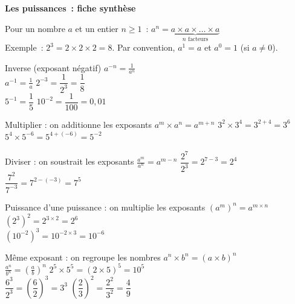 \documentclass[14pt]{extarticle}
\begin{document}
{\centering\LARGE\bfseries Les puissances~: fiche synthèse\par}
\vspace{4pt}

\begin{tcolorbox}[colback=GrayBG!50, colframe=BlueDef, fonttitle=\bfseries, title=Définition]
  Pour un nombre $a$ et un entier $n \geqslant 1$~: \hfill $a^n = \underbrace{a \times a \times \dots \times a}_{n \text{ facteurs}}$ \hfill\null \\[2pt]
  Exemple~: $2^3 = 2 \times 2 \times 2 = 8$. \hfill Par convention, $a^1 = a$ et $a^0 = 1$ (si $a \neq 0$).
\end{tcolorbox}

\begin{regle}{Inverse (exposant négatif)}
  $\displaystyle a^{-n} = \frac{1}{a^n}$ \\[5pt]
  $\displaystyle a^{-1} = \frac{1}{a}$
  \tcblower
  $2^{-3} = \dfrac{1}{2^3} = \dfrac{1}{8}$ \\[5pt]
  $5^{-1} = \dfrac{1}{5}$ \qquad $10^{-2} = \dfrac{1}{100} = 0{,}01$
\end{regle}

\begin{regle}{Multiplier : on additionne les exposants}
  $\displaystyle a^m \times a^n = a^{m+n}$
  \tcblower
  $3^2 \times 3^4 = 3^{2+4} = 3^6$ \\[5pt]
  $5^4 \times 5^{-6} = 5^{4+(-6)} = 5^{-2}$
\end{regle}

\begin{regle}{Diviser : on soustrait les exposants}
  $\displaystyle \frac{a^m}{a^n} = a^{m-n}$
  \tcblower
  $\dfrac{2^7}{2^3} = 2^{7-3} = 2^4$ \\[5pt]
  $\dfrac{7^2}{7^{-3}} = 7^{2-(-3)} = 7^5$
\end{regle}

\begin{regle}{Puissance d'une puissance : on multiplie les exposants}
  $\displaystyle \left(a^m\right)^n = a^{m \times n}$
  \tcblower
  $\left(2^3\right)^2 = 2^{3 \times 2} = 2^6$ \\[5pt]
  $\left(10^{-2}\right)^3 = 10^{-2 \times 3} = 10^{-6}$
\end{regle}

\begin{regle}{Même exposant : on regroupe les nombres}
  $\displaystyle a^n \times b^n = (a \times b)^n$ \\[5pt]
  $\displaystyle \frac{a^n}{b^n} = \left(\frac{a}{b}\right)^n$
  \tcblower
  $2^5 \times 5^5 = (2 \times 5)^5 = 10^5$ \\[5pt]
  $\dfrac{6^3}{2^3} = \left(\dfrac{6}{2}\right)^3 = 3^3$ \quad $\left(\dfrac{2}{3}\right)^2 = \dfrac{2^2}{3^2} = \dfrac{4}{9}$
\end{regle}
\end{document}
